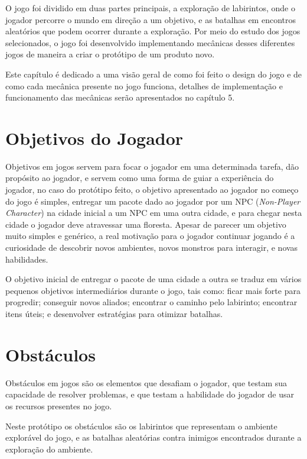 O jogo foi dividido em duas partes principais, a exploração de labirintos, onde o jogador percorre o mundo em direção a um objetivo, e as batalhas em encontros aleatórios que podem ocorrer durante a exploração. Por meio do estudo dos jogos selecionados, o jogo foi desenvolvido implementando mecânicas desses diferentes jogos de maneira a criar o protótipo de um produto novo.

	Este capítulo é dedicado a uma visão geral de como foi feito o design do jogo e de como cada mecânica presente no jogo funciona, detalhes de implementação e funcionamento das mecânicas serão apresentados no capítulo 5.

\section{Objetivos do Jogador}

Objetivos em jogos servem para focar o jogador em uma determinada tarefa, dão propósito ao jogador, e servem como uma forma de guiar a experiência do jogador, no caso do protótipo feito, o objetivo apresentado ao jogador no começo do jogo é simples, entregar um pacote dado ao jogador por um NPC (\emph{Non-Player Character}) na cidade inicial a um NPC em uma outra cidade, e para chegar nesta cidade o jogador deve atravessar uma floresta. Apesar de parecer um objetivo muito simples e genérico, a real motivação para o jogador continuar jogando é a curiosidade de descobrir novos ambientes, novos monstros para interagir, e novas habilidades.

	O objetivo inicial de entregar o pacote de uma cidade a outra se traduz em vários pequenos objetivos intermediários durante o jogo, tais como: ficar mais forte para progredir; conseguir novos aliados; encontrar o caminho pelo labirinto; encontrar itens úteis; e desenvolver estratégias para otimizar batalhas.

\section{Obstáculos}

Obstáculos em jogos são os elementos que desafiam o jogador, que testam sua capacidade de resolver problemas, e que testam a habilidade do jogador de usar os recursos presentes no jogo.

	Neste protótipo os obstáculos são os labirintos que representam o ambiente explorável do jogo, e as batalhas aleatórias contra inimigos encontrados durante a exploração do ambiente.

